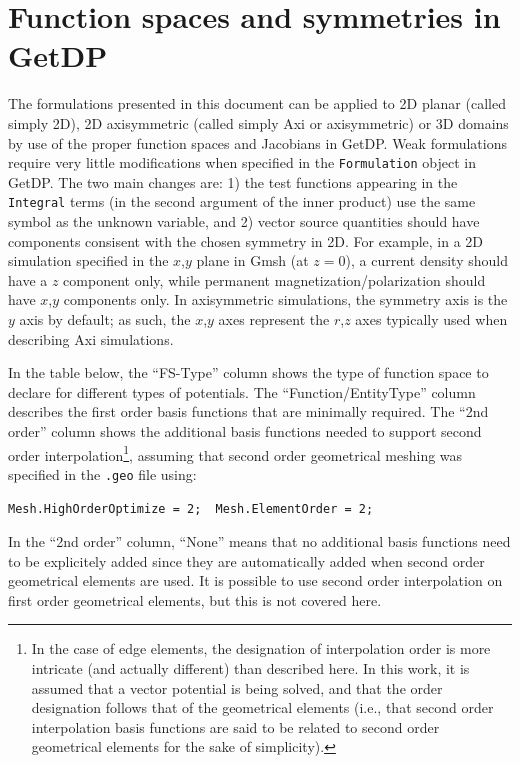 \documentclass[letterpaper]{article}
\newcommand{\keyw}[1]{\texttt{\small #1}}
\begin{document}
\appendix



\clearpage
\section{Function spaces and symmetries in GetDP}
\label{sec_getdp}

The formulations presented in this document can be applied to 2D planar (called simply 2D), 2D axisymmetric (called simply Axi or axisymmetric) or 3D domains by use of the proper function spaces and Jacobians in GetDP. Weak formulations require very little modifications when specified in the \keyw{Formulation} object in GetDP. The two main changes are: 1) the test functions appearing in the \keyw{Integral} terms (in the second argument of the inner product) use the same symbol as the unknown variable, and 2) vector source quantities should have components consisent with the chosen symmetry in 2D. For example, in a 2D simulation specified in the $x$,$y$ plane in Gmsh (at $z=0$), a current density should have a $z$ component only, while permanent magnetization/polarization should have $x$,$y$ components only. In axisymmetric simulations, the symmetry axis is the $y$ axis by default; as such, the $x$,$y$ axes represent the $r$,$z$ axes typically used when describing Axi simulations.

In the table below, the ``FS-Type'' column shows the type of function space to declare for different types of potentials. The ``Function/EntityType'' column describes the first order basis functions that are minimally required. The ``2nd order'' column shows the additional basis functions needed to support second order interpolation\footnote{In the case of edge elements, the designation of interpolation order is more intricate (and actually different) than described here. In this work, it is assumed that a vector potential is being solved, and that the order designation follows that of the geometrical elements (i.e., that second order interpolation basis functions are said to be related to second order geometrical elements for the sake of simplicity).}, assuming that second order geometrical meshing was specified in the \texttt{.geo} file using:
\begin{center}
\keyw{Mesh.HighOrderOptimize = 2;~~Mesh.ElementOrder = 2;}
\end{center}
In the ``2nd order'' column, ``None'' means that no additional basis functions need to be explicitely added since they are automatically added when second order geometrical elements are used. It is possible to use second order interpolation on first order geometrical elements, but this is not covered here.
\end{document}
